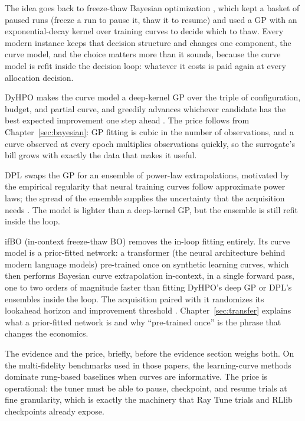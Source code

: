 The idea goes back to freeze-thaw Bayesian optimization
\citep{swersky2014freezethaw}, which kept a basket of paused runs
(freeze a run to pause it, thaw it to resume) and
used a GP with an exponential-decay kernel over training curves to
decide which to thaw. Every modern instance keeps that decision
structure and changes one component, the curve model, and the choice
matters more than it sounds, because the curve model is refit inside
the decision loop: whatever it costs is paid again at every
allocation decision.

DyHPO makes the curve model a deep-kernel GP over the triple of
configuration, budget, and partial curve, and greedily advances
whichever candidate has the best expected improvement one step ahead
\citep{wistuba2022dyhpo}. The price follows from
Chapter~\ref{sec:bayesian}: GP fitting is cubic in the number of
observations, and a curve observed at every epoch multiplies
observations quickly, so the surrogate's bill grows with exactly the
data that makes it useful.

DPL swaps the GP for an ensemble of power-law extrapolations,
motivated by the empirical regularity that neural training curves
follow approximate power laws; the spread of the ensemble supplies
the uncertainty that the acquisition needs \citep{kadra2023dpl}. The
model is lighter than a deep-kernel GP, but the ensemble is still
refit inside the loop.

ifBO (in-context freeze-thaw BO) removes the in-loop fitting entirely.
Its curve model is a prior-fitted network: a transformer (the neural
architecture behind modern language models) pre-trained once on
synthetic learning curves, which then performs Bayesian curve
extrapolation
in-context, in a single forward pass, one to two orders of magnitude
faster than fitting DyHPO's deep GP or DPL's ensembles inside the
loop. The acquisition paired with it randomizes its lookahead horizon
and improvement threshold \citep{rakotoarison2024ifbo}.
Chapter~\ref{sec:transfer} explains what a prior-fitted network is
and why ``pre-trained once'' is the phrase that changes the
economics.

The evidence and the price, briefly, before the evidence section
weighs both. On the multi-fidelity benchmarks used in those papers,
the learning-curve methods dominate rung-based baselines when curves
are informative. The price is operational: the tuner must be able to
pause, checkpoint, and resume trials at fine granularity, which is
exactly the machinery that Ray Tune trials and RLlib checkpoints
already expose.

